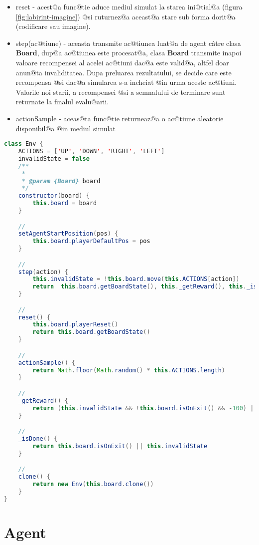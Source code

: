 \begin{itemize}
	\item reset - acest@a func@tie aduce mediul simulat la starea ini@tial@a (figura \ref{fig:labirint-imagine}) @si ruturnez@a aceast@a stare sub forma dorit@a (codificare sau imagine).
	\item step(ac@tiune) - aceasta transmite ac@tiunea luat@a de agent c\^ atre clasa \textbf{Board}, dup@a ac@tiunea este procesat@a, clasa \textbf{Board} transmite inapoi valoare recompensei al acelei ac@tiuni dac@a este valid@a, altfel doar anun@ta invaliditatea. Dupa preluarea rezultatului, se decide care este recompensa @si dac@a simularea s-a incheiat @in urma aceste ac@tiuni. Valorile noi starii, a recompensei @si a semnalului de terminare sunt returnate la finalul evalu@arii.
	\item actionSample - aceas@ta func@tie returneaz@a o ac@tiune aleatorie disponibil@a @in mediul simulat
\end{itemize}



\begin{lstlisting}[language=Java, caption=Definirea clasei Env]
class Env {
    ACTIONS = ['UP', 'DOWN', 'RIGHT', 'LEFT']
    invalidState = false
    /**
     * 
     * @param {Board} board 
     */
    constructor(board) {
        this.board = board
    }

    //
    setAgentStartPosition(pos) {
        this.board.playerDefaultPos = pos
    }

    // 
    step(action) {
        this.invalidState = !this.board.move(this.ACTIONS[action])
        return  this.board.getBoardState(), this._getReward(), this._isDone()]
    }

    //
    reset() {
        this.board.playerReset()
        return this.board.getBoardState()
    }

    //
    actionSample() {
        return Math.floor(Math.random() * this.ACTIONS.length)
    }

    //
    _getReward() {
        return (this.invalidState && !this.board.isOnExit() && -100) || this.board.getPlayerCellValue()
    }

    //
    _isDone() {
        return this.board.isOnExit() || this.invalidState
    }

    //
    clone() {
        return new Env(this.board.clone())
    }
}
\end{lstlisting}


\section{Agent}
 
